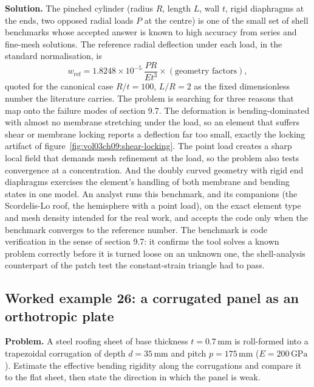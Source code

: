 \textbf{Solution.} The pinched cylinder (radius $R$, length $L$, wall $t$,
rigid diaphragms at the ends, two opposed radial loads $P$ at the centre) is
one of the small set of shell benchmarks whose accepted answer is known to
high accuracy from series and fine-mesh solutions. The reference radial
deflection under each load, in the standard normalisation, is
\[
w_{\text{ref}} = 1.8248\times 10^{-5}\ \frac{P R}{E t^3}\times(\text{geometry
factors}),
\]
quoted for the canonical case $R/t = 100$, $L/R = 2$ as the fixed
dimensionless number the literature carries. The problem is searching for
three reasons that map onto the failure modes of section 9.7. The
deformation is bending-dominated with almost no membrane stretching under
the load, so an element that suffers shear or membrane locking reports a
deflection far too small, exactly the locking artifact of
figure~\ref{fig:vol03ch09:shear-locking}. The point load creates a sharp
local field that demands mesh refinement at the load, so the problem also
tests convergence at a concentration. And the doubly curved geometry with
rigid end diaphragms exercises the element's handling of both membrane and
bending states in one model. An analyst runs this benchmark, and its
companions (the Scordelis-Lo roof, the hemisphere with a point load), on
the exact element type and mesh density intended for the real work, and
accepts the code only when the benchmark converges to the reference number.
The benchmark is code verification in the sense of section 9.7: it confirms
the tool solves a known problem correctly before it is turned loose on an
unknown one, the shell-analysis counterpart of the patch test the
constant-strain triangle had to pass.

\subsection*{Worked example 26: a corrugated panel as an orthotropic plate}



\textbf{Problem.} A steel roofing sheet of base thickness $t = 0.7\,\si{
\milli\meter}$ is roll-formed into a trapezoidal corrugation of depth
$d = 35\,\si{\milli\meter}$ and pitch $p = 175\,\si{\milli\meter}$ ($E =
200\,\text{GPa}$). Estimate the effective bending rigidity along the
corrugations and compare it to the flat sheet, then state the direction in
which the panel is weak.

